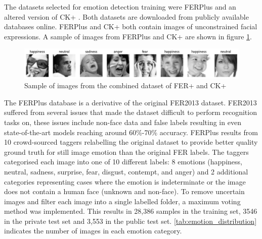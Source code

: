 The datasets selected for emotion detection training were FERPlus \cite{BarsoumICMI2016} and an altered version of CK+ \cite{5543262}. Both datasets are downloaded from publicly available databases online. FERPlus and CK+ both contain images of unconstrained facial expressions. A sample of images from FERPlus and CK+ are shown in figure \ref{figure:sample_imgs}.

\begin{figure}[!htb]
    \centering{}
    \includegraphics[scale=0.5]{fed_images/random_imgs.png}
    \caption{Sample of images from the combined dataset of FER+ and CK+}
    \label{figure:sample_imgs}
\end{figure}

The FERPlus database is a derivative of the original FER2013 dataset. FER2013 suffered from several issues that made the dataset difficult to perform recognition tasks on, these issues include non-face data and false labels resulting in even state-of-the-art models reaching around 60\%-70\% accuracy. FERPlus results from 10 crowd-sourced taggers relabelling the original dataset to provide better quality ground truth for still image emotion than the original FER labels. The taggers categorised each image into one of 10 different labels: 8 emotions (happiness, neutral, sadness, surprise, fear, disgust, contempt, and anger) and 2 additional categories representing cases where the emotion is indeterminate or the image does not contain a human face (unknown and non-face). To remove uncertain images and filter each image into a single labelled folder, a maximum voting method was implemented. This results in 28,386 samples in the training set, 3546 in the private test set and 3,553 in the public test set. \ref{tab:emotion_distribution} indicates the number of images in each emotion category.

